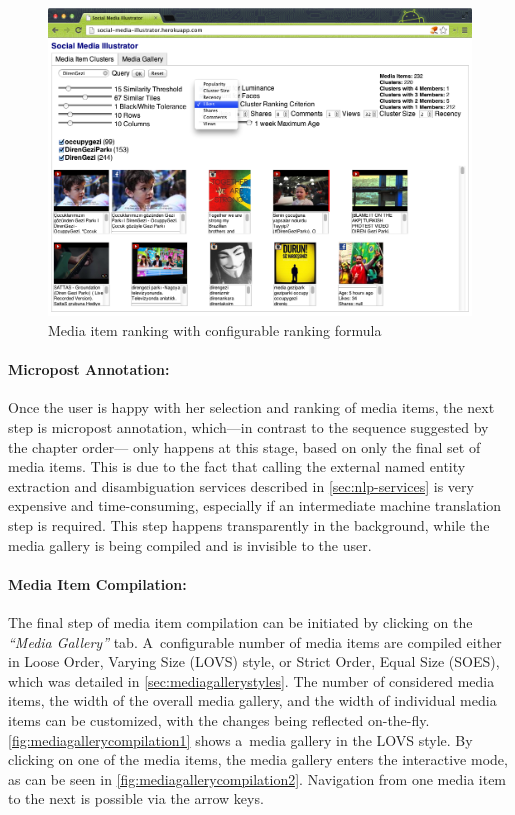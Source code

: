 \begin{figure}[!ht]
  \centering
  \includegraphics[width=1\columnwidth]{app3.png}
  \caption{Media item ranking with configurable ranking formula}
  \label{fig:mediaitemranking}
\end{figure}

\paragraph{Micropost Annotation:}

Once the user is happy with her selection and ranking of media items,
the next step is micropost annotation,
which---in contrast to the sequence suggested by the chapter order---%
only happens at this stage, based on only the final set of media items.
This is due to the fact that calling the external
named entity extraction and disambiguation services described in
\autoref{sec:nlp-services} is very expensive and time-consuming,
especially if an intermediate machine translation step is required.
This step happens transparently in the background,
while the media gallery is being compiled and is invisible to the user.

\paragraph{Media Item Compilation:}

The final step of media item compilation can be initiated
by clicking on the \emph{``Media Gallery''} tab.
A~configurable number of media items are compiled either in
Loose Order, Varying Size (LOVS) style, or
Strict Order, Equal Size (SOES), which was detailed in
\autoref{sec:mediagallerystyles}.
The number of considered media items,
the width of the overall media gallery,
and the width of individual media items can be customized,
with the changes being reflected on-the-fly.
\autoref{fig:mediagallerycompilation1} shows a~media gallery
in the LOVS style.
By clicking on one of the media items,
the media gallery enters the interactive mode,
as can be seen in \autoref{fig:mediagallerycompilation2}.
Navigation from one media item to the next is possible via the arrow keys.

